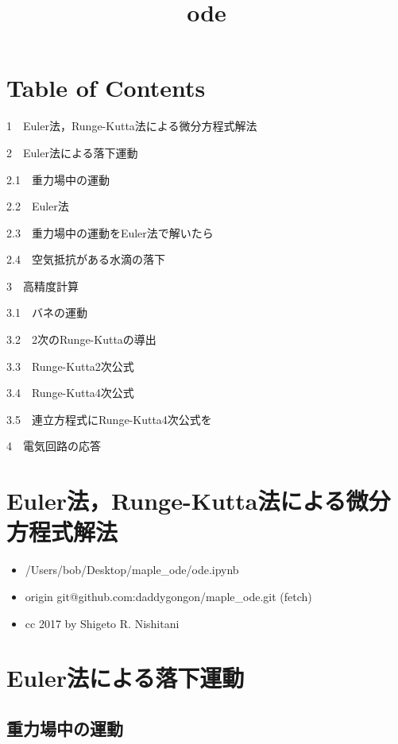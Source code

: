 \documentclass[11pt,dvipdfmx]{jsarticle}
\title{ode}
\providecommand{\tightlist}{%
      \setlength{\itemsep}{0pt}\setlength{\parskip}{0pt}}
\begin{document}
    
    
    \maketitle
    
    

    
    \section{Table of Contents}\label{table-of-contents}

{1~~}Euler法，Runge-Kutta法による微分方程式解法

{2~~}Euler法による落下運動

{2.1~~}重力場中の運動

{2.2~~}Euler法

{2.3~~}重力場中の運動をEuler法で解いたら

{2.4~~}空気抵抗がある水滴の落下

{3~~}高精度計算

{3.1~~}バネの運動

{3.2~~}2次のRunge-Kuttaの導出

{3.3~~}Runge-Kutta2次公式

{3.4~~}Runge-Kutta4次公式

{3.5~~}連立方程式にRunge-Kutta4次公式を

{4~~}電気回路の応答

    \section{Euler法，Runge-Kutta法による微分方程式解法}\label{eulerux6cd5runge-kuttaux6cd5ux306bux3088ux308bux5faeux5206ux65b9ux7a0bux5f0fux89e3ux6cd5}

\begin{itemize}
\tightlist
\item
  /Users/bob/Desktop/maple\_ode/ode.ipynb
\item
  origin git@github.com:daddygongon/maple\_ode.git (fetch)
\item
  cc 2017 by Shigeto R. Nishitani
\end{itemize}

    \section{Euler法による落下運動}\label{eulerux6cd5ux306bux3088ux308bux843dux4e0bux904bux52d5}

\subsection{重力場中の運動}\label{ux91cdux529bux5834ux4e2dux306eux904bux52d5}
\end{document}
